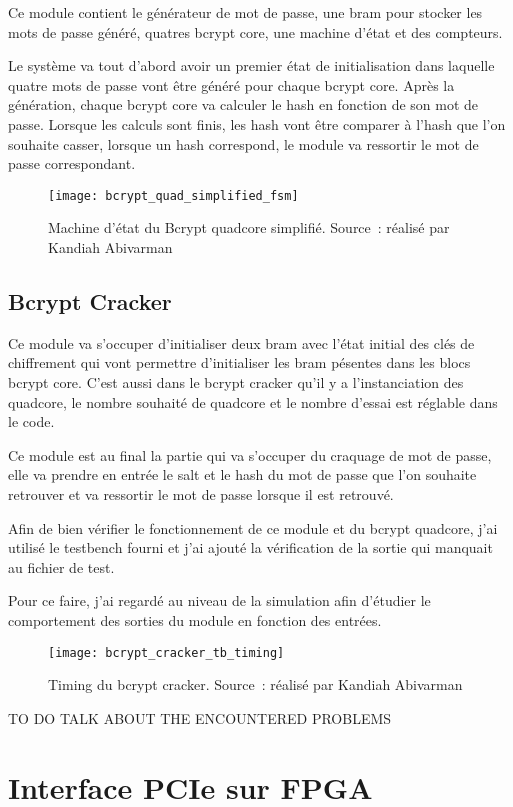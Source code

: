 Ce module contient le générateur de mot de passe, une \gls{bram} pour stocker les mots de passe généré, quatres bcrypt core, une machine d'état et des compteurs.

Le système va tout d'abord avoir un premier état de initialisation dans laquelle quatre mots de passe vont être généré pour chaque bcrypt core. Après la génération, chaque bcrypt core va calculer le hash en fonction de son mot de passe. Lorsque les calculs sont finis, les hash vont être comparer à l'hash que l'on souhaite casser, lorsque un hash correspond, le module va ressortir le mot de passe correspondant.

\begin{figure}[tbph!]
	\centering
	\texttt{[image: bcrypt\_quad\_simplified\_fsm]}
	\caption[Machine d'état Bcrypt quadcore simplifié]{Machine d'état du Bcrypt quadcore simplifié. Source : réalisé par Kandiah Abivarman}
	\label{fig:bcrypt_quad_simplified_fsm}
\end{figure}

\subsection{Bcrypt Cracker}

Ce module va s'occuper d'initialiser deux \gls{bram} avec l'état initial des clés de chiffrement qui vont permettre d'initialiser les \gls{bram} pésentes dans les blocs bcrypt core. C'est aussi dans le bcrypt cracker qu'il y a l'instanciation des quadcore, le nombre souhaité de quadcore et le nombre d'essai est réglable dans le code.

Ce module est au final la partie qui va s'occuper du craquage de mot de passe, elle va prendre en entrée le salt et le hash du mot de passe que l'on souhaite retrouver et va ressortir le mot de passe lorsque il est retrouvé.  

Afin de bien vérifier le fonctionnement de ce module et du bcrypt quadcore, j'ai utilisé le testbench fourni et j'ai ajouté la vérification de la sortie qui manquait au fichier de test.

Pour ce faire, j'ai regardé au niveau de la simulation afin d'étudier le comportement des sorties du module en fonction des entrées.

\begin{figure}[tbph!]
	\centering
	\texttt{[image: bcrypt\_cracker\_tb\_timing]}
	\caption[Timing du bcrypt cracker]{Timing du bcrypt cracker. Source : réalisé par Kandiah Abivarman}
	\label{fig:bcrypt_cracker_tb_timing}
\end{figure}

TO DO TALK ABOUT THE ENCOUNTERED PROBLEMS

\section{Interface PCIe sur FPGA}